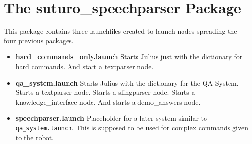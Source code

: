 \documentclass[main.tex]{subfiles}
\begin{document}
    
\section{The suturo\_speechparser Package}
    This package contains three launchfiles created to launch nodes spreading the four previous packages.\\
    \begin{itemize}
        \item \textbf{hard\_commands\_only.launch}
            \subitem Starts Julius just with the dictionary for hard commands.
            \subitem And start a textparser node.
        \item \textbf{qa\_system.launch}
            \subitem Starts Julius with the dictionary for the QA-System.
            \subitem Starts a textparser node.
            \subitem Starts a slingparser node.
            \subitem Starts a knowledge\_interface node.
            \subitem And starts a demo\_answers node.        
        \item \textbf{speechparser.launch}
            \subitem Placeholder for a later system similar to \texttt{qa\_system.launch}. This is supposed to be used for complex commands given to the robot.  
        
    \end{itemize}
     
    	
\end{document}
